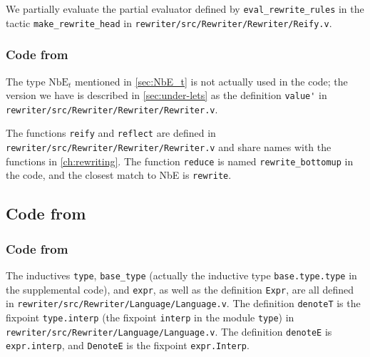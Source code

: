 \begin{subappendices}
We partially evaluate the partial evaluator defined by \verb|eval_rewrite_rules| in the \Ltac{} tactic \verb|make_rewrite_head| in \texttt{rewriter/src/Rewriter/Rewriter/Reify.v}.

\subsubsection{Code from }

The type $\text{NbE}_t$ mentioned in \autoref{sec:NbE_t} is not actually used in the code; the version we have is described in \autoref{sec:under-lets} as the definition \verb|value'| in \texttt{rewriter/src/Rewriter/Rewriter/Rewriter.v}.

The functions \verb|reify| and \verb|reflect| are defined in \texttt{rewriter/src/Rewriter/Rewriter/Rewriter.v} and share names with the functions in \autoref{ch:rewriting}.
The function \texttt{reduce} is named \verb|rewrite_bottomup| in the code, and the closest match to NbE is \verb|rewrite|.

\subsection{Code from }

\subsubsection{Code from }

The inductives \verb|type|, \verb|base_type| (actually the inductive type \verb|base.type.type| in the supplemental code), and \verb|expr|, as well as the definition \verb|Expr|, are all defined in \texttt{rewriter/src/Rewriter/Language/Language.v}.
The definition \verb|denoteT| is the fixpoint \verb|type.interp| (the fixpoint \verb|interp| in the module \verb|type|) in \texttt{rewriter/src/Rewriter/Language/Language.v}.
The definition \verb|denoteE| is \verb|expr.interp|, and \verb|DenoteE| is the fixpoint \verb|expr.Interp|.


\end{subappendices}
